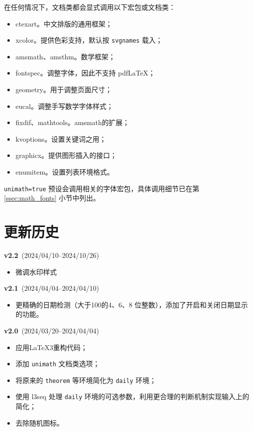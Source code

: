 \documentclass{SYSUDaily}
\begin{document}
在任何情况下，文档类都会显式调用以下宏包或文档类：
\begin{itemize}[parsep=0pt,itemsep=0pt]
	\item
			\textsf{ctexart}。中文排版的通用框架；
	\item
			\textsf{xcolor}。提供色彩支持，默认按 \verb|svgnames| 载入；
	\item
			\textsf{amsmath}、\textsf{amsthm}。数学框架；
	\item
			\textsf{fontspec}。调整字体，因此不支持 pdf\LaTeX{}；
	\item
			\textsf{geometry}。用于调整页面尺寸；
	\item
			\textsf{eucal}。调整手写数学字体样式；
	\item
			\textsf{fixdif}、\textsf{mathtools}。\textsf{amsmath}的扩展；
	\item
			\textsf{kvoptions}。设置关键词之用；
	\item
			\textsf{graphicx}。提供图形插入的接口；
	\item
			\textsf{enumitem}。设置列表环境格式。
\end{itemize}
\verb|unimath=true| 预设会调用相关的字体宏包，具体调用细节已在第 \ref{ssec:math_fonts} 小节中列出。

\section{更新历史}
\begin{flushleft}
	\footnotesize
	\textbf{v2.2}~(2024/04/10--2024/10/26)
	\begin{itemize}[parsep=0pt,itemsep=0pt]
		\item 微调水印样式
	\end{itemize}

	\textbf{v2.1}~(2024/04/04--2024/04/10)
	\begin{itemize}[parsep=0pt,itemsep=0pt]
		\item
				更精确的日期检测（大于100的4、6、8 位整数），添加了开启和关闭日期显示的功能。
	\end{itemize}
  
	\textbf{v2.0}~(2024/03/20--2024/04/04)
	\begin{itemize}[parsep=0pt,itemsep=0pt]
		\item
				应用\LaTeX{3}重构代码；
		\item
				添加 \verb|unimath| 文档类选项；
		\item
				将原来的 \verb|theorem| 等环境简化为 \verb|daily| 环境；
		\item
				使用 \textsf{l3seq} 处理 \verb|daily| 环境的可选参数，利用更合理的判断机制实现输入上的简化；
		\item
				去除随机图标。
	\end{itemize}
\end{flushleft}
\end{document}
